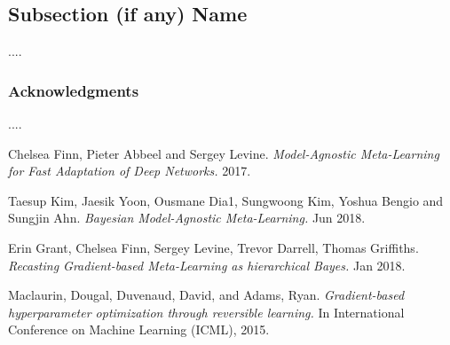 \documentclass[a4paper]{article}
\begin{document}
\subsection*{Subsection (if any) Name}

....

\subsubsection*{Acknowledgments}

....
\pagebreak
\begin{thebibliography}{9}
Chelsea Finn, Pieter Abbeel and Sergey Levine.
\textit{Model-Agnostic Meta-Learning for Fast Adaptation of Deep Networks.}
2017.

Taesup Kim, Jaesik Yoon, Ousmane Dia1, Sungwoong Kim, Yoshua Bengio and Sungjin Ahn.
\textit{Bayesian Model-Agnostic Meta-Learning.}
Jun 2018.

Erin Grant, Chelsea Finn, Sergey Levine, Trevor Darrell, Thomas Griffiths.
\textit{Recasting Gradient-based Meta-Learning as hierarchical Bayes.}
Jan 2018.

Maclaurin, Dougal, Duvenaud, David, and Adams, Ryan.
\textit{Gradient-based hyperparameter optimization through reversible learning.}
In International Conference on Machine Learning (ICML), 2015.
\end{thebibliography}
\end{document}
